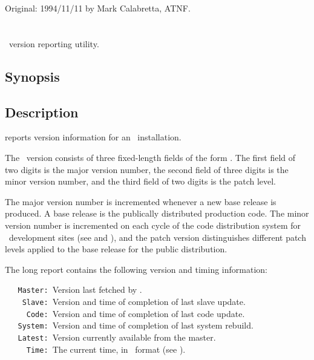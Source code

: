 Original: 1994/11/11 by Mark Calabretta, ATNF.


\newpage
\section{}
\label{avers}

\aipspp\ version reporting utility.

\subsection*{Synopsis}

\begin{synopsis}
\end{synopsis}

\subsection*{Description}

 reports version information for an \aipspp\ installation.

The \aipspp\ version consists of three fixed-length fields of the form
.  The first field of two digits is the major version number,
the second field of three digits is the minor version number, and the third
field of two digits is the patch level.

The major version number is incremented whenever a new base release is
produced.  A base release is the publically distributed production code.
The minor version number is incremented on each cycle of the code distribution
system for \aipspp\ development sites (see  and
), and the patch version distinguishes different patch levels
applied to the base release for the public distribution.

The long report contains the following version and timing information:

\noindent
\verb+   Master: +Version last fetched by .\\
\verb+    Slave: +Version and time of completion of last slave update.\\
\verb+     Code: +Version and time of completion of last code update.\\
\verb+   System: +Version and time of completion of last system rebuild.\\
\verb+   Latest: +Version currently available from the master.\\
\verb+     Time: +The current time, in \aipspp\ format (see ).

